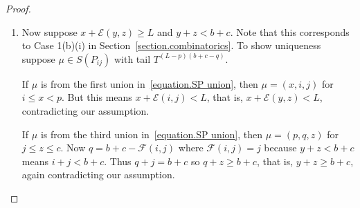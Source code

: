 \documentclass[11pt,reqno]{amsart}
\theoremstyle{definition}
\numberwithin{equation}{section}
\begin{document}
\begin{proof}
\begin{enumerate}
{Now we show that $\mu \in S(P_{yz})$.  First we need to check $P_{yz}$ satisfies the pseudohead conditions:
\begin{itemize}
\item Condition \eqref{p1}: $0 \leqslant z \leqslant c$ is immediate.
\item Condition \eqref{p2}: $z\leqslant y \leqslant b+c$ is immediate.
\item Condition \eqref{p3}: $4y+z \leqslant a+3b+3c$.  If $\epsilon_{yz}=0$ then the original assumption becomes $x+y-z<L$ 
and we also have $y+z \leqslant b+c$.  Adding the first inequality to twice the second yields $x+3y+z < a+3b+3c$ and we 
are done since $y \leqslant x$.  If $\epsilon_{yz}>0$ then the original assumption reduces directly to $x+3y+z < a+3b+3c$ 
so we are done for the same reason.
\item Condition \eqref{p4}: $y-2z \leqslant a$. First suppose $\epsilon_{yz}=0$.  Now, since $\mu$ is a negative partition we 
either have $z \geqslant \lceil \frac{y-a}{2}\rceil$ which would mean $2z \geqslant y-a$ and we would be done, or else, 
$z \geqslant b+c-x$. In the second case: $\epsilon_{yz}=0$ along with the original assumption  imply $x+y-z<L$, and 
subtracting from this the inequality $x+z \geqslant b+c$ gives $y-2z<a$.  Finally, if $\epsilon_{yz}>0$ then we have 
$y+z>b+c$.  Subtracting three times this from $4y+z \leqslant a+3b+3c$ (which we have already verified) gives $y-2z<a$.
\end{itemize}
Now that $P_{yz}$ is in fact a pseudohead it is obvious that $\mu \in S(P_{yz})$
(in the first union) because $x<L-\mathcal{E}(y,z)$.}

\item{Now suppose $x+\mathcal{E}(y,z)\geqslant L$ and $y+z<b+c$. Note that this corresponds to 
Case 1(b)(i) in Section~\ref{section.combinatorics}. To show uniqueness suppose $\mu \in S(P_{ij})$ 
with tail $T^{(L-p)(b+c-q)}$. 

If $\mu$ is from the first union in~\eqref{equation.SP union}, then $\mu=(x,i,j)$ for $i \leqslant x <p$. But this means 
$x+\mathcal{E}(i,j)<L$, that is, $x+\mathcal{E}(y,z)<L$, contradicting our assumption.

If $\mu$ is from the third union in~\eqref{equation.SP union}, then $\mu = (p,q,z)$ for $j \leqslant z \leqslant c$.
Now $q=b+c-\mathcal{F}(i,j)$ where $\mathcal{F}(i,j)=j$ because $y+z < b+c$ means $i+j <b+c$.  Thus $q+j=b+c$ so 
$q+z \geqslant b+c$, that is, $y+z \geqslant b+c$, again contradicting our assumption.

}
\end{enumerate}
\end{proof}
\end{document}
